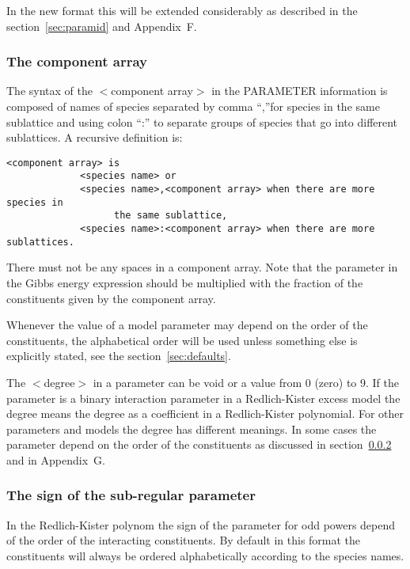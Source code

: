 \documentclass[12pt]{article}
\begin{document}
\bigskip

In the new format this will be extended considerably as described
in the section~\ref{sec:paramid} and Appendix~F.

\subsubsection{The component array}\label{sec:comparr}

The syntax of the $<$component array$>$ in the PARAMETER information is
composed of names of species separated by comma ``,''for species in the
same sublattice and using colon ``:'' to separate groups of species that
go into different sublattices.  A recursive definition is:

\begin{verbatim}
<component array> is
             <species name> or
             <species name>,<component array> when there are more species in
                   the same sublattice,
             <species name>:<component array> when there are more sublattices.
\end{verbatim}

There must not be any spaces in a component array.  Note that the
parameter in the Gibbs energy expression should be multiplied with the
fraction of the constituents given by the component array.

Whenever the value of a model parameter may depend on the order of the
constituents, the alphabetical order will be used unless something
else is explicitly stated, see the section~\ref{sec:defaults}.

The $<$degree$>$ in a parameter can be void or a value from 0 (zero)
to 9.  If the parameter is a binary interaction parameter in a
Redlich-Kister excess model the degree means the degree as a
coefficient in a Redlich-Kister polynomial.  For other parameters and
models the degree has different meanings.  In some cases the parameter
depend on the order of the constituents as discussed in
section~\ref{sec:subreg} and in Appendix~G.

\subsubsection{The sign of the sub-regular parameter}\label{sec:subreg}

In the Redlich-Kister polynom the sign of the parameter for odd powers
depend of the order of the interacting constituents.  By default in
this format the constituents will always be ordered alphabetically
according to the species names.
\end{document}

